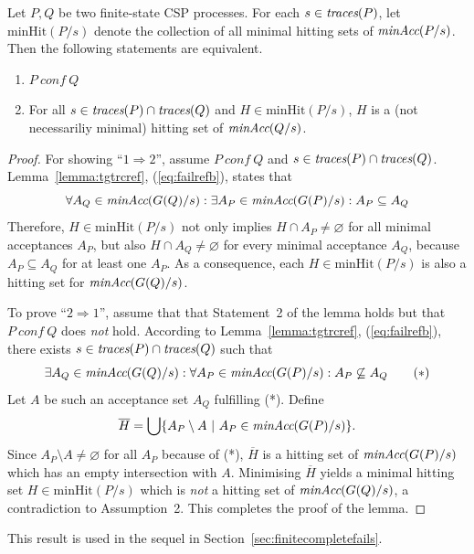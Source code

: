 \begin{lemma}
\label{lemma:hseta}
Let $P, Q$ be two finite-state CSP processes.
For each $s\in\text{\it traces}(P)$,
let $\text{minHit}(P/s)$ denote the
collection of all minimal hitting sets of $\text{\it minAcc}(P/s)$.
Then the following statements are equivalent.
\begin{enumerate}
\item $P\ conf\ Q$  

\item For all $s\in\text{\it traces}(P)\cap \text{\it traces}(Q)$ and $H \in  \text{minHit}(P/s)$, $H$ is
a (not necessariliy minimal) hitting set of $\text{\it minAcc}(Q/s)$.
\end{enumerate}
\end{lemma}
\begin{proof}
For showing ``$1 \Rightarrow 2$'', assume   $P\ conf\ Q$ and  
  $s\in\text{\it traces}(P)\cap \text{\it traces}(Q)$. Lemma~\ref{lemma:tgtrcref},
(\ref{eq:failrefb}), states that
\[
\forall A_Q\in\text{\it minAcc}(G(Q)/s):
\exists A_P\in\text{\it minAcc}(G(P)/s): A_P\subseteq A_Q
\]
Therefore, $H \in  \text{minHit}(P/s)$ not only implies $H\cap
A_P\neq\varnothing$ for all minimal acceptances $A_P$, but also $H\cap
A_Q\neq\varnothing$ for every minimal acceptance $A_Q$, because $A_P\subseteq
A_Q$ for at least one $A_P$. As a consequence, each $H \in
\text{minHit}(P/s)$ is also a hitting set for $\text{\it minAcc}(G(Q)/s)$.

To prove ``$2 \Rightarrow 1$'', assume that that Statement~2 of the lemma holds but 
that  $P\ conf\ Q$ does {\it not} hold. 
According to Lemma~\ref{lemma:tgtrcref}, (\ref{eq:failrefb}), there
exists $s\in\text{\it traces}(P)\cap \text{\it traces}(Q)$ such that
\[
\exists A_Q\in\text{\it minAcc}(G(Q)/s): \forall A_P\in\text{\it minAcc}(G(P)/s): A_P\not\subseteq A_Q
\qquad (*)
\]
Let $A$ be such an acceptance set $A_Q$ fulfilling (*).
Define
\[
\overline H = \bigcup\{ A_P \setminus A~|~A_P\in\text{\it minAcc}(G(P)/s) \}.
\]
Since $A_P \setminus A \neq\varnothing$ for all $A_P$ because of (*),
$\overline H$ is a hitting set of $\text{\it minAcc}(G(P)/s)$ which has an  empty
intersection with $A$. 
Minimising $\overline H$ yields   a minimal hitting set $H\in
\text{minHit}(P/s)$ which is {\it not} a hitting set of $\text{\it minAcc}(G(Q)/s)$, a
contradiction to Assumption~2. This completes the proof of the lemma. \xbox
\end{proof}
%
This result is used in the sequel in Section~\ref{sec:finitecompletefails}.

%
%

